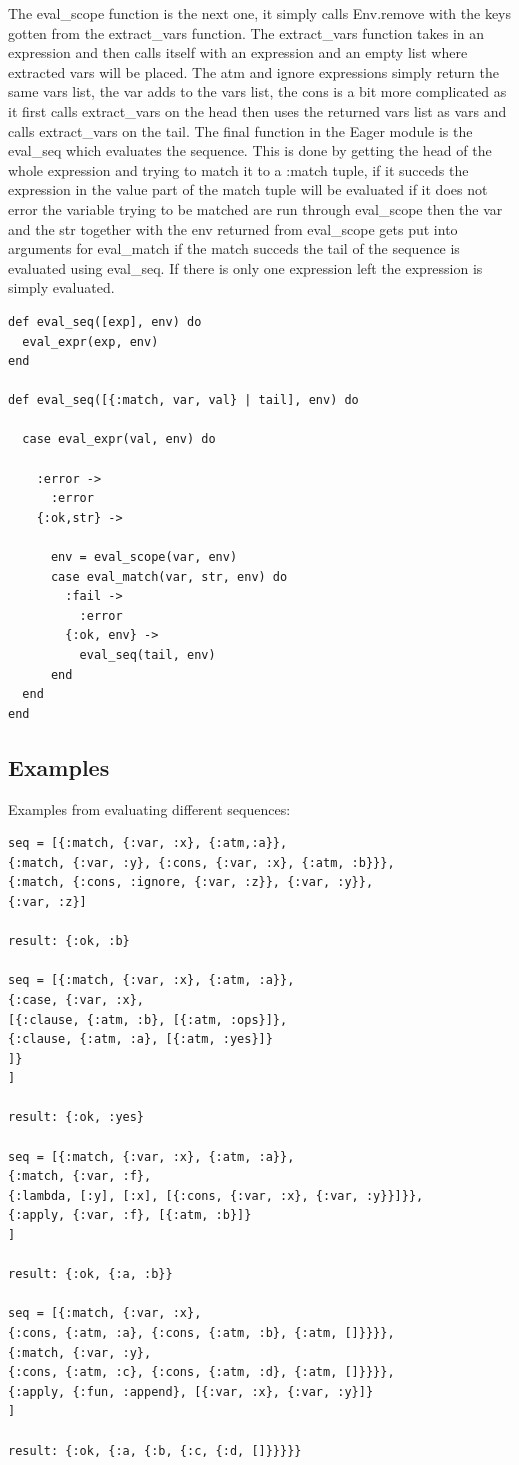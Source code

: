 \documentclass[a4paper,11pt]{article}
\begin{document}
The eval\_scope function is the next one, it simply calls Env.remove with the keys gotten from the extract\_vars function. The extract\_vars function takes in an expression and then calls itself with an expression and an empty list where extracted vars will be placed. The atm and ignore expressions simply return the same vars list, the var adds to the vars list, the cons is a bit more complicated as it first calls extract\_vars on the head then uses the returned vars list as vars and calls extract\_vars on the tail. 
The final function in the Eager module is the eval\_seq which evaluates the sequence. 
This is done by getting the head of the whole expression and trying to match it to a :match tuple, if it succeds the expression in the value part of the match tuple will be evaluated if it does not error the variable trying to be matched are run through eval\_scope then the var and the str together with the env returned from eval\_scope gets put into arguments for eval\_match if the match succeds the tail of the sequence is evaluated using eval\_seq. If there is only one expression left the expression is simply evaluated.
\begin{verbatim}
def eval_seq([exp], env) do
  eval_expr(exp, env)
end

def eval_seq([{:match, var, val} | tail], env) do

  case eval_expr(val, env) do

    :error ->
      :error
    {:ok,str} ->

      env = eval_scope(var, env)
      case eval_match(var, str, env) do
        :fail ->
          :error
        {:ok, env} ->
          eval_seq(tail, env)
      end
  end
end
\end{verbatim}
\subsection*{Examples}
Examples from evaluating different sequences:

\begin{verbatim}
seq = [{:match, {:var, :x}, {:atm,:a}},
{:match, {:var, :y}, {:cons, {:var, :x}, {:atm, :b}}},
{:match, {:cons, :ignore, {:var, :z}}, {:var, :y}},
{:var, :z}]

result: {:ok, :b}

seq = [{:match, {:var, :x}, {:atm, :a}},
{:case, {:var, :x},
[{:clause, {:atm, :b}, [{:atm, :ops}]},
{:clause, {:atm, :a}, [{:atm, :yes}]}
]}
]

result: {:ok, :yes}

seq = [{:match, {:var, :x}, {:atm, :a}},
{:match, {:var, :f},
{:lambda, [:y], [:x], [{:cons, {:var, :x}, {:var, :y}}]}},
{:apply, {:var, :f}, [{:atm, :b}]}
]

result: {:ok, {:a, :b}}

seq = [{:match, {:var, :x},
{:cons, {:atm, :a}, {:cons, {:atm, :b}, {:atm, []}}}},
{:match, {:var, :y},
{:cons, {:atm, :c}, {:cons, {:atm, :d}, {:atm, []}}}},
{:apply, {:fun, :append}, [{:var, :x}, {:var, :y}]}
]

result: {:ok, {:a, {:b, {:c, {:d, []}}}}}
\end{verbatim}
\end{document}
